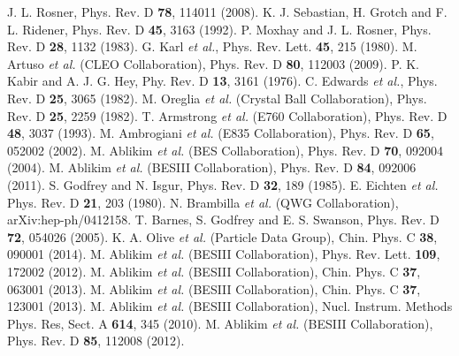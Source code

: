 \documentclass[prd,twocolumn,showpacs,amsmath,amssymb]{revtex4-1}
\begin{document}
\begin{thebibliography}{99}
J. L. Rosner, Phys. Rev. D \textbf{78}, 114011 (2008).
K. J. Sebastian, H. Grotch and F. L. Ridener, Phys. Rev. D \textbf{45}, 3163 (1992).
P. Moxhay and J. L. Rosner, Phys. Rev. D \textbf{28}, 1132 (1983).
G. Karl {\it et al.}, Phys. Rev. Lett. \textbf{45}, 215 (1980).
M. Artuso {\it et al.} (CLEO Collaboration), Phys. Rev. D \textbf{80}, 112003 (2009).
P. K. Kabir and A. J. G. Hey, Phy. Rev. D \textbf{13}, 3161 (1976).
C. Edwards {\it et al.}, Phys. Rev. D \textbf{25}, 3065 (1982).
M. Oreglia {\it et al.} (Crystal Ball Collaboration), Phys. Rev. D \textbf{25}, 2259 (1982).
T. Armstrong {\it et al.} (E760 Collaboration), Phys. Rev. D \textbf{48}, 3037 (1993).
M. Ambrogiani {\it et al.} (E835 Collaboration), Phys. Rev. D \textbf{65}, 052002 (2002).
M. Ablikim {\it et al.} (BES Collaboration), Phys. Rev. D \textbf{70}, 092004 (2004).
M. Ablikim {\it et al.} (BESIII Collaboration), Phys. Rev. D \textbf{84}, 092006 (2011).
S. Godfrey and N. Isgur, Phys. Rev. D \textbf{32}, 189 (1985).
E. Eichten {\it et al.} Phys. Rev. D \textbf{21}, 203 (1980).
N. Brambilla {\it et al.} (QWG Collaboration), arXiv:hep-ph/0412158.
T. Barnes, S. Godfrey and E. S. Swanson, Phys. Rev. D \textbf{72}, 054026 (2005).
K. A. Olive {\it et al.} (Particle Data Group), Chin. Phys. C \textbf{38}, 090001 (2014).
M. Ablikim {\it et al.} (BESIII Collaboration), Phys. Rev. Lett. \textbf{109}, 172002 (2012).
M. Ablikim {\it et al.} (BESIII Collaboration), Chin. Phys. C \textbf{37}, 063001 (2013).
M. Ablikim {\it et al.} (BESIII Collaboration), Chin. Phys. C \textbf{37}, 123001 (2013).
M. Ablikim {\it et al.} (BESIII Collaboration), Nucl. Instrum. Methods Phys. Res, Sect. A \textbf{614}, 345 (2010).
M. Ablikim {\it et al.} (BESIII Collaboration), Phys. Rev. D \textbf{85}, 112008 (2012).

\end{thebibliography}
\end{document}
